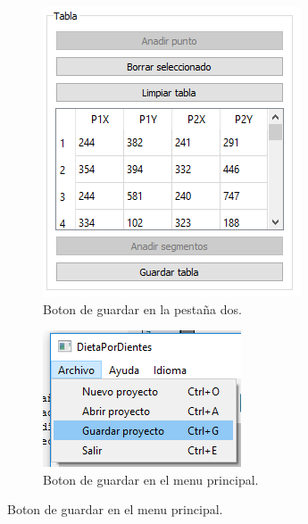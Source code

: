 \documentclass[13pt]{book}              %
\begin{document}
{\begin{figure}
	\begin{subfigure}[c]{.5\linewidth}
	\centering\large \includegraphics[width=.9\textwidth]{BotonGuarPesta}
	\caption{Boton de guardar en la pestaña dos.}\label{fig:BotonGuarPesta}
	\end{subfigure}%
	\begin{subfigure}[c]{.5\linewidth}
	\centering\large \includegraphics[width=.9\textwidth]{BotonGuar}
	\caption{Boton de guardar en el menu principal.}\label{fig:BotonGuar}
	\end{subfigure}%
\end{figure}
}
\end{document}
